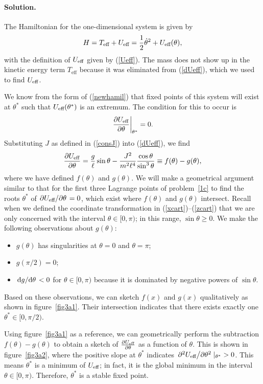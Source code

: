 \documentclass[11pt]{article}
\newcommand{\refeq}[1]{(\ref{#1})}
\newenvironment{solution}
{
    \paragraph{Solution.}
    \ignorespaces
}
{
    \bigskip
}
\begin{document}
\newcommand{\ptheta}{p_\theta}
\newcommand{\pthetad}{\dot{p}_\theta}
\newcommand{\Teff}{T_\text{eff}}

\begin{solution}
	The Hamiltonian for the one-dimensional system is given by
	\begin{equation} \label{newhamil}
		H = \Teff + \Ueff = \frac{1}{2} \thetad^2 + \Ueff(\theta),
	\end{equation}
	with the definition of $U_\text{eff}$ given by \refeq{Ueff}.  The mass does not show up in the kinetic energy term $\Teff$ because it was eliminated from \refeq{dUeff}, which we used to find $U_\text{eff}$.
	
	We know from the form of \refeq{newhamil} that fixed points of this system will exist at $\theta^*$ such that $U_\text{eff}(\theta^*)$ is an extremum.  The condition for this to occur is
	\begin{equation}
		\left. \pdv{U_\text{eff}}{\theta} \right|_{\theta^*} = 0.
	\end{equation}
	Substituting $J$ as defined in \refeq{consJ} into \refeq{dUeff}, we find
	\begin{equation} \label{newtheta}
		\pdv{U_\text{eff}}{\theta} = \frac{g}{\ell} \sin{\theta} - \frac{J^2}{m^2 \ell^4} \frac{\cos{\theta}}{\sin^3{\theta}} \equiv f(\theta) - g(\theta),
	\end{equation}
	where we have defined $f(\theta)$ and $g(\theta)$.  We will make a geometrical argument similar to that for the first three Lagrange points of problem~\ref{1c} to find the roots $\theta^*$ of $\pdv*{U_\text{eff}}{\theta} = 0$, which exist where $f(\theta)$ and $g(\theta)$ intersect.  Recall when we defined the coordinate transformation in \refeq{xcart}--\refeq{zcart} that we are only concerned with the interval $\theta \in [0, \pi)$; in this range, $\sin{\theta} \geq 0$.  We make the following observations about $g(\theta)$:
	\begin{itemize}
		\item $g(\theta)$ has singularities at $\theta = 0$ and $\theta = \pi$;
		\item $g(\pi/2) = 0$;
		\item $\dv*{g}{\theta} < 0$ for $\theta \in [0, \pi)$ because it is dominated by negative powers of $\sin{\theta}$.
	\end{itemize}
	Based on these observations, we can sketch $f(x)$ and $g(x)$ qualitatively as shown in figure~\ref{fig3a1}.  Their intersection indicates that there exists exactly one $\theta^* \in [0, \pi/2)$.
	
	Using figure~\ref{fig3a1} as a reference, we can geometrically perform the subtraction $f(\theta) - g(\theta)$ to obtain a sketch of $\pdv{U_\text{eff}}{\theta}$ as a function of $\theta$.  This is shown in figure~\ref{fig3a2}, where the positive slope at $\theta^*$ indicates $\pdv*[2]{U_\text{eff}}{\theta}|_{\theta^*} > 0$.  This means $\theta^*$ is a minimum of $U_\text{eff}$; in fact, it is the global minimum in the interval $\theta \in [0, \pi)$.  Therefore, $\theta^*$ is a stable fixed point.



\end{solution}
\end{document}

